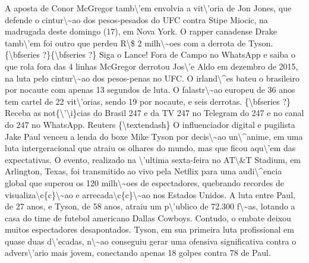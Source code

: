 \documentclass{article}%
\begin{document}
\newline%
A aposta de Conor McGregor tamb\textbackslash{}'em envolvia a vit\textbackslash{}'oria de Jon Jones, que defende o cintur\textbackslash{}\textasciitilde{}ao dos pesos{-}pesados do UFC contra Stipe Miocic, na madrugada deste domingo (17), em Nova York. O rapper canadense Drake tamb\textbackslash{}'em foi outro que perdeu R\textbackslash{}\$ 2 milh\textbackslash{}\textasciitilde{}oes com a derrota de Tyson.\newline%
\newline%
\{\textbackslash{}bfseries ?\}\{\textbackslash{}bfseries ?\} Siga o Lance! Fora de Campo no WhatsApp e saiba o que rola fora das 4 linhas\newline%
\newline%
McGregor derrotou Jos\textbackslash{}'e Aldo em dezembro de 2015, na luta pelo cintur\textbackslash{}\textasciitilde{}ao dos pesos{-}penas no UFC. O irland\textbackslash{}\^{}es bateu o brasileiro por nocaute com apenas 13 segundos de luta. O falastr\textbackslash{}\textasciitilde{}ao europeu de 36 anos tem cartel de 22 vit\textbackslash{}'orias, sendo 19 por nocaute, e seis derrotas. \{\textbackslash{}bfseries ?\} Receba as not\{\textbackslash{}'\textbackslash{}i\}cias do Brasil 247 e da TV 247 no Telegram do 247 e no canal do 247 no WhatsApp.\newline%
\newline%
Reuters \{\textbackslash{}textendash\} O influenciador digital e pugilista Jake Paul venceu a lenda do boxe Mike Tyson por decis\textbackslash{}\textasciitilde{}ao un\textbackslash{}\^{}anime, em uma luta intergeracional que atraiu os olhares do mundo, mas que ficou aqu\textbackslash{}'em das expectativas. O evento, realizado na \textbackslash{}'ultima sexta{-}feira no AT\textbackslash{}\&T Stadium, em Arlington, Texas, foi transmitido ao vivo pela Netflix para uma audi\textbackslash{}\^{}encia global que superou os 120 milh\textbackslash{}\textasciitilde{}oes de espectadores, quebrando recordes de visualiza\textbackslash{}c\{c\}\textbackslash{}\textasciitilde{}ao e arrecada\textbackslash{}c\{c\}\textbackslash{}\textasciitilde{}ao nos Estados Unidos.\newline%
\newline%
A luta entre Paul, de 27 anos, e Tyson, de 58 anos, atraiu um p\textbackslash{}'ublico de 72.300 f\textbackslash{}\textasciitilde{}as, lotando a casa do time de futebol americano Dallas Cowboys. Contudo, o embate deixou muitos espectadores desapontados. Tyson, em sua primeira luta profissional em quase duas d\textbackslash{}'ecadas, n\textbackslash{}\textasciitilde{}ao conseguiu gerar uma ofensiva significativa contra o advers\textbackslash{}'ario mais jovem, conectando apenas 18 golpes contra 78 de Paul.\newline%
\end{document}
